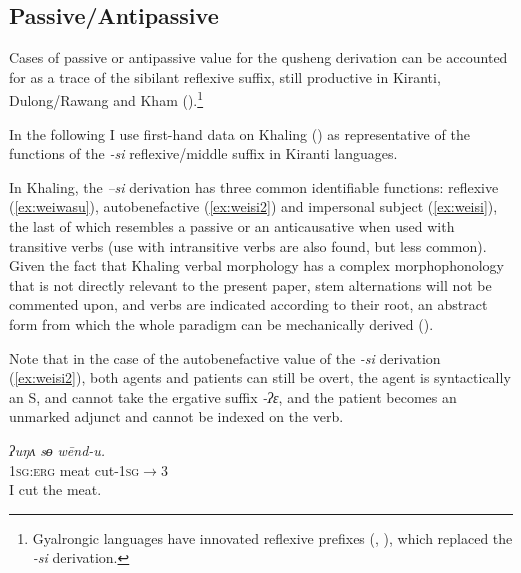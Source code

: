\documentclass[oneside,a4paper,11pt]{article}
\newcommand{\ipa}[1]{{\phon\textit{\mbox{#1}}}}
\begin{document}

\subsection{Passive/Antipassive} \label{sec:passive}
Cases of passive or antipassive value for the qusheng derivation can be accounted for as a trace of the sibilant reflexive suffix, still productive in Kiranti, Dulong/Rawang and Kham (\citealt[320]{driem93agreement}).\footnote{Gyalrongic languages have innovated reflexive prefixes (\citealt{jacques10refl}, \citealt[89]{lai13affixale}), which replaced the \ipa{-si} derivation.} 

In the following I use first-hand data on Khaling (\citealt{jacques16si}) as representative of the functions of the \ipa{-si} reflexive/middle suffix in Kiranti languages.



In Khaling, the  \ipa{--si} derivation has three common identifiable functions: reflexive (\ref{ex:weiwasu}), autobenefactive (\ref{ex:weisi2}) and impersonal subject (\ref{ex:weisi}), the last of which resembles a passive or an anticausative when used with transitive verbs (use with intransitive verbs are also found, but less common). Given the fact that Khaling verbal morphology has a complex morphophonology that is not directly relevant to the present paper, stem alternations will not be commented upon, and verbs are indicated according to their root, an abstract form from which the whole paradigm can be mechanically derived (\citealt{jacques12khaling, jacques16si}).

Note that in the case of the autobenefactive value of the \ipa{-si} derivation (\ref{ex:weisi2}), both agents and patients can still be overt, the agent is syntactically an S, and cannot take the ergative suffix \ipa{-ʔɛ}, and the patient becomes an unmarked adjunct and cannot be indexed on the verb.
 
\begin{exe}
\ex \label{ex:wendu} 
\gll 
\ipa{ʔuŋʌ}  	\ipa{sɵ}  	\ipa{wēnd-u.}  \\
\textsc{1sg:erg} meat cut-\textsc{1sg$\rightarrow$3} \\
\glt I cut the meat.
\end{exe}
\end{document}
